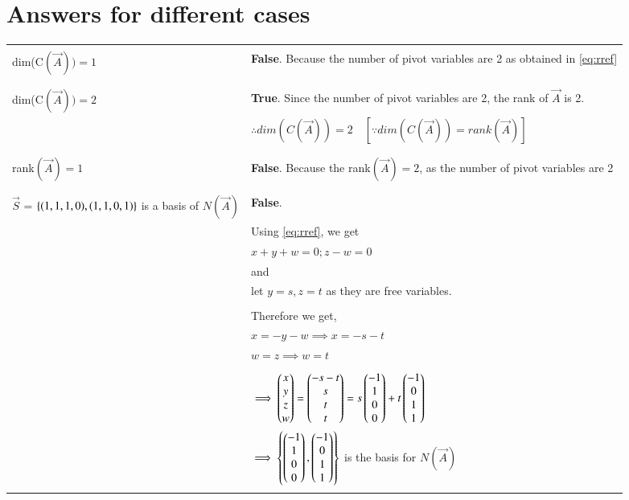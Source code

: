 \documentclass[journal,12pt,twocolumn]{IEEEtran}
\newcommand\myemptypage{
	\null
	\thispagestyle{empty}
	\addtocounter{page}{-1}
	\newpage
}
\begin{document}
\section{Answers for different cases}
\pagebreak
\myemptypage
\begin{table}[h]
	\begin{tabular}{|m{4.5cm}|l|}
		\hline
		&\\
		dim(C$(\vec{A})) = 1$ 
		& \textbf{False}. Because the number of pivot variables are 2 as obtained in \eqref{eq:rref}\\
		&\\
		\hline
		&\\
		dim(C$(\vec{A})) = 2$
		& \textbf{True}. Since the number of pivot variables are 2, the rank of $\vec{A}$ is 2.\\
		&$\therefore dim(C(\vec{A})) = 2 \quad [\because dim(C(\vec{A})) = rank(\vec{A})]$ \\
		&\\
		\hline
		&\\
	     rank$(\vec{A}) = 1$
		& \textbf{False}. Because the rank$(\vec{A}) = 2$, as the number of pivot variables are 2\\
		&\\
		\hline
		&\\
		$\vec{S}$ = $\left\{(1, 1, 1, 0), (1, 1, 0, 1)\right\}$ is a basis of $N(\vec{A})$
		& \textbf{False}. \\
		& Using \eqref{eq:rref}, we get \\
		&$x + y + w = 0 ; z - w = 0$ \\
		& and\\
		& let $y = s, z = t$ as they are free variables.\\ 
		&\\
		& Therefore we get,\\
		&$x = -y - w \implies x = -s - t$ \\
		& $w = z \implies w = t$\\
		&\\
		&$\implies \begin{pmatrix}x \\ y \\ z\\ w\end{pmatrix} = \begin{pmatrix}-s -t \\ s \\ t \\ t\end{pmatrix} = s \begin{pmatrix}-1 \\ 1 \\ 0 \\ 0\end{pmatrix} + t \begin{pmatrix}-1 \\ 0 \\ 1 \\ 1\end{pmatrix}$\\
		& $\implies  \left\{\begin{pmatrix}-1 \\ 1 \\ 0 \\ 0\end{pmatrix} , \begin{pmatrix}-1 \\ 0 \\ 1 \\ 1\end{pmatrix}\right\}$ is the basis for $N(\vec{A})$\\
		&\\
		\hline
	\end{tabular}
\end{table}
\end{document}
